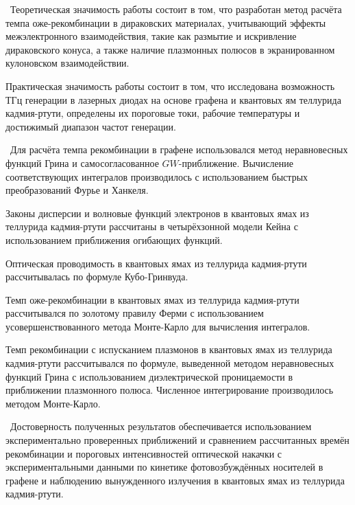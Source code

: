 \influence\
Теоретическая значимость работы состоит в том, что разработан метод расчёта темпа оже-рекомбинации в дираковских материалах, учитывающий эффекты межэлектронного взаимодействия, такие как размытие и искривление дираковского конуса, а также наличие плазмонных полюсов в экранированном кулоновском взаимодействии.

Практическая значимость работы состоит в том, что исследована возможность ТГц генерации в лазерных диодах на основе графена и квантовых ям теллурида кадмия-ртути, определены их пороговые токи, рабочие температуры и достижимый диапазон частот генерации.

\methods\
Для расчёта темпа рекомбинации в графене использовался метод неравновесных функций Грина и самосогласованное $GW$-приближение. Вычисление соответствующих интегралов производилось с использованием быстрых преобразований Фурье и Ханкеля.

Законы дисперсии и волновые функций электронов в квантовых ямах из теллурида кадмия-ртути рассчитаны в четырёхзонной модели Кейна с использованием приближения огибающих функций.

Оптическая проводимость в квантовых ямах из теллурида кадмия-ртути рассчитывалась по формуле Кубо-Гринвуда.

Темп оже-рекомбинации в квантовых ямах из теллурида кадмия-ртути рассчитывался по золотому правилу Ферми с использованием усовершенствованного метода Монте-Карло для вычисления интегралов.

Темп рекомбинации с испусканием плазмонов в квантовых ямах из теллурида кадмия-ртути рассчитывался по формуле, выведенной методом неравновесных функций Грина с использованием диэлектрической проницаемости в приближении плазмонного полюса. Численное интегрирование производилось методом Монте-Карло.

\probation\
Достоверность полученных результатов обеспечивается использованием экспериментально проверенных приближений и сравнением рассчитанных времён рекомбинации и пороговых интенсивностей оптической накачки с экспериментальными данными по кинетике фотовозбуждённых носителей в графене и наблюдению вынужденного излучения в квантовых ямах из теллурида кадмия-ртути.

